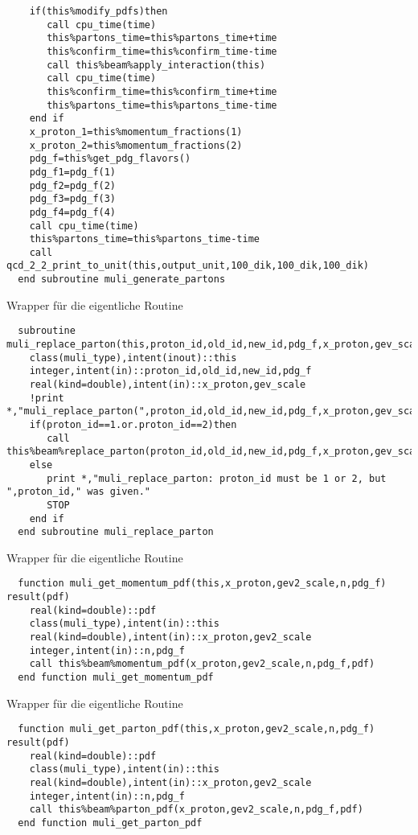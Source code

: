 \begin{Verbatim}
    if(this%modify_pdfs)then
       call cpu_time(time)
       this%partons_time=this%partons_time+time
       this%confirm_time=this%confirm_time-time
       call this%beam%apply_interaction(this)
       call cpu_time(time)
       this%confirm_time=this%confirm_time+time
       this%partons_time=this%partons_time-time
    end if
    x_proton_1=this%momentum_fractions(1)
    x_proton_2=this%momentum_fractions(2)
    pdg_f=this%get_pdg_flavors()
    pdg_f1=pdg_f(1)
    pdg_f2=pdg_f(2)
    pdg_f3=pdg_f(3)
    pdg_f4=pdg_f(4)
    call cpu_time(time)
    this%partons_time=this%partons_time-time
    call qcd_2_2_print_to_unit(this,output_unit,100_dik,100_dik,100_dik)
  end subroutine muli_generate_partons
\end{Verbatim}

Wrapper für die eigentliche Routine 
\begin{Verbatim}
  subroutine muli_replace_parton(this,proton_id,old_id,new_id,pdg_f,x_proton,gev_scale)
    class(muli_type),intent(inout)::this
    integer,intent(in)::proton_id,old_id,new_id,pdg_f
    real(kind=double),intent(in)::x_proton,gev_scale
    !print *,"muli_replace_parton(",proton_id,old_id,new_id,pdg_f,x_proton,gev_scale,")"
    if(proton_id==1.or.proton_id==2)then
       call this%beam%replace_parton(proton_id,old_id,new_id,pdg_f,x_proton,gev_scale)
    else
       print *,"muli_replace_parton: proton_id must be 1 or 2, but ",proton_id," was given."
       STOP
    end if
  end subroutine muli_replace_parton
\end{Verbatim}
Wrapper für die eigentliche Routine 
\begin{Verbatim}
  function muli_get_momentum_pdf(this,x_proton,gev2_scale,n,pdg_f) result(pdf)
    real(kind=double)::pdf
    class(muli_type),intent(in)::this
    real(kind=double),intent(in)::x_proton,gev2_scale
    integer,intent(in)::n,pdg_f
    call this%beam%momentum_pdf(x_proton,gev2_scale,n,pdg_f,pdf)
  end function muli_get_momentum_pdf
\end{Verbatim}
Wrapper für die eigentliche Routine 
\begin{Verbatim}
  function muli_get_parton_pdf(this,x_proton,gev2_scale,n,pdg_f) result(pdf)
    real(kind=double)::pdf
    class(muli_type),intent(in)::this
    real(kind=double),intent(in)::x_proton,gev2_scale
    integer,intent(in)::n,pdg_f
    call this%beam%parton_pdf(x_proton,gev2_scale,n,pdg_f,pdf)
  end function muli_get_parton_pdf
\end{Verbatim}

